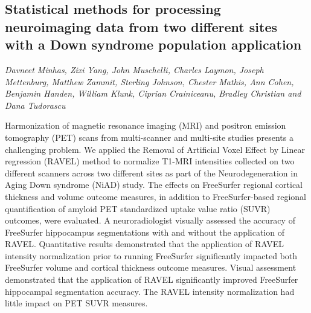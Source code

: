 \documentclass[../booklet.tex]{subfiles}
\begin{document}
\subsection[Statistical methods for processing neuroimaging data from two different sites with a Down syndrome population application. {\it Davneet Minhas, Zixi Yang, John Muschelli, Charles Laymon, Joseph Mettenburg, Matthew Zammit, Sterling Johnson, Chester Mathis, Ann Cohen, Benjamin Handen, William Klunk, Ciprian Crainiceanu, Bradley Christian and Dana Tudorascu}]{Statistical methods for processing neuroimaging data from two different sites with a Down syndrome population application}
             

\begin{center}
  {\it Davneet Minhas, Zixi Yang, John Muschelli, Charles Laymon, Joseph Mettenburg, Matthew Zammit, Sterling Johnson, Chester Mathis, Ann Cohen, Benjamin Handen, William Klunk, Ciprian Crainiceanu, Bradley Christian and Dana Tudorascu}
\end{center}

\vskip 0.8cm

Harmonization of magnetic resonance imaging (MRI) and positron emission tomography (PET) scans from multi-scanner and multi-site studies presents a challenging problem. We applied the Removal of Artificial Voxel Effect by Linear regression (RAVEL) method to normalize T1-MRI intensities collected on two different scanners across two different sites as part of the Neurodegeneration in Aging Down syndrome (NiAD) study. The effects on FreeSurfer regional cortical thickness and volume outcome measures, in addition to FreeSurfer-based regional quantification of amyloid PET standardized uptake value ratio (SUVR) outcomes, were evaluated. A neuroradiologist visually assessed the accuracy of FreeSurfer hippocampus segmentations with and without the application of RAVEL. Quantitative results demonstrated that the application of RAVEL intensity normalization prior to running FreeSurfer significantly impacted both FreeSurfer volume and cortical thickness outcome measures. Visual assessment demonstrated that the application of RAVEL significantly improved FreeSurfer hippocampal segmentation accuracy. The RAVEL intensity normalization had little impact on PET SUVR measures.

\end{document}
